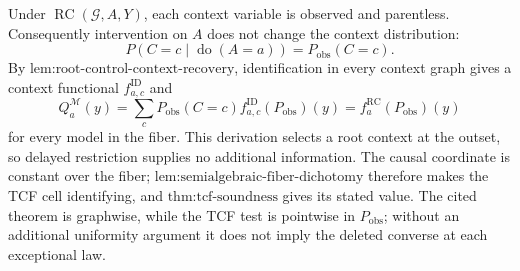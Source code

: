 Under \(\operatorname{RC}(\mathcal G,A,Y)\), each context variable is observed and parentless. Consequently intervention on \(A\) does not change the context distribution:
\[
P(C=c\mid\operatorname{do}(A=a))=P_{\mathrm{obs}}(C=c).
\]
By \(\text{lem:root-control-context-recovery}\), identification in every context graph gives a context functional \(f^{\mathrm{ID}}_{a,c}\) and
\[
Q_a^{\mathcal M}(y)
=\sum_cP_{\mathrm{obs}}(C=c)f^{\mathrm{ID}}_{a,c}(P_{\mathrm{obs}})(y)
=f_a^{\mathrm{RC}}(P_{\mathrm{obs}})(y)
\]
for every model in the fiber. This derivation selects a root context at the outset, so delayed restriction supplies no additional information. The causal coordinate is constant over the fiber; \(\text{lem:semialgebraic-fiber-dichotomy}\) therefore makes the TCF cell identifying, and \(\text{thm:tcf-soundness}\) gives its stated value. The cited theorem is graphwise, while the TCF test is pointwise in \(P_{\mathrm{obs}}\); without an additional uniformity argument it does not imply the deleted converse at each exceptional law.